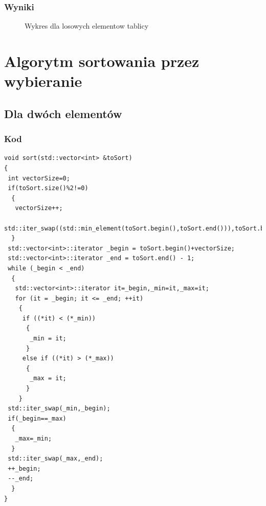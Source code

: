 \subsubsection*{Wyniki}
\begin{figure}[h!]
  \begin{center}
    \caption{Wykres dla losowych elementow tablicy}
  \end{center}
\end{figure}
\FloatBarrier

\section{Algorytm sortowania przez wybieranie}
\subsection{Dla dwóch elementów}
\subsubsection*{Kod}
\begin{lstlisting}
void sort(std::vector<int> &toSort)
{
 int vectorSize=0;
 if(toSort.size()%2!=0)
  {
   vectorSize++;
   std::iter_swap((std::min_element(toSort.begin(),toSort.end())),toSort.begin());
  }
 std::vector<int>::iterator _begin = toSort.begin()+vectorSize;
 std::vector<int>::iterator _end = toSort.end() - 1;
 while (_begin < _end)
  {
   std::vector<int>::iterator it=_begin,_min=it,_max=it;
   for (it = _begin; it <= _end; ++it)
    {
     if ((*it) < (*_min))
      {
	   _min = it;
	  }
	 else if ((*it) > (*_max))
	  {
	   _max = it;
	  }
    }
 std::iter_swap(_min,_begin);
 if(_begin==_max)
  {
   _max=_min;
  }
 std::iter_swap(_max,_end);
 ++_begin;
 --_end;
  }
}
\end{lstlisting}
